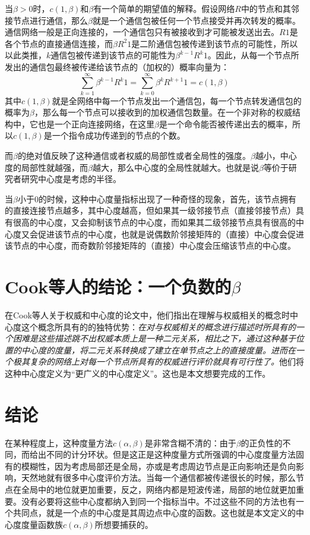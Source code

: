 \documentclass{ctexart}
\begin{document}
        当$\beta>0$时，$c(1,\beta)$和$\beta$有一个简单的期望值的解释。假设网络$R$中的节点和其邻接节点进行通信，那么$\beta$就是一个通信包被任何一个节点接受并再次转发的概率。通信网络一般是正向连接的，一个通信包只有被接收到才可能被发送出去。$R1$是各个节点的直接通信连接，而$\beta R^2 1$是二阶通信包被传递到该节点的可能性，所以以此类推，$k$通信包被传递到该节点的可能性为$\beta^{k-1}R^k1$。因此，从每一个节点所发出的通信包最终被传递给该节点的（加权的）概率向量为：
        $$
            \sum_{k=1}^{\infty} \beta^{k-1}R^k 1 = \sum_{k=0}^{\infty} \beta^k R^{k+1} 1 = c(1,\beta)
        $$
        其中$c(1,\beta)$就是全网络中每一个节点发出一个通信包，每一个节点转发通信包的概率为$\beta$，那么每一个节点可以接收到的加权通信包数量。在一个非对称的权威结构中，它也是一个正向连接网络，在这里$\beta$是一个命令能否被传递出去的概率，所以$c(1,\beta)$是一个指令成功传递到的节点的个数。
        
        而$\beta$的绝对值反映了这种通信或者权威的局部性或者全局性的强度。$\beta$越小，中心度的局部性就越强，而$\beta$越大，那么中心度的全局性就越大。也就是说$\beta$等价于研究者研究中心度是考虑的半径。
        
        当$\beta$小于0的时候，这种中心度量指标出现了一种奇怪的现象，首先，该节点拥有的直接连接节点越多，其中心度越高，但如果其一级邻接节点（直接邻接节点）具有很高的中心度，又会抑制该节点的中心度，而如果其二级邻接节点具有很高的中心度又会促进该节点的中心度，也就是说偶数阶邻接矩阵的（直接）中心度会促进该节点的中心度，而奇数阶邻接矩阵的（直接）中心度会压缩该节点的中心度。
        
    \section{Cook等人的结论：一个负数的$\beta$}
        在Cook等人关于权威和中心度的论文中，他们指出在理解与权威相关的概念时中心度这个概念所具有的的独特优势：\emph{在对与权威相关的概念进行描述时所具有的一个困难是这些描述跳不出权威本质上是一种二元关系，相比之下，通过这种基于位置的中心度的度量，将二元关系转换成了建立在单节点之上的直接度量。进而在一个极其复杂的网络上对每一个节点所具有的权威进行评价就具有可行性了。}他们将这种中心度定义为“更广义的中心度定义”。这也是本文想要完成的工作。
        
    \section{结论}
        在某种程度上，这种度量方法$c(\alpha,\beta)$是非常含糊不清的：由于$\beta$的正负性的不同，而给出不同的计分环状。但是这正是这种度量方式所强调的中心度度量方法固有的模糊性，因为考虑局部还是全局，亦或是考虑周边节点是正向影响还是负向影响，天然地就有很多中心度评价方法。当每一个通信都被传递很长的时候，那么节点在全局中的地位就更加重要，反之，网络内都是短波传递，局部的地位就更加重要。没有必要将这些中心度都纳入到同一个指标当中。不过这些不同的方法也有一个共同点，就是一个点的中心度是其周边点中心度的函数。这也就是本文定义的中心度度量函数族$c(\alpha,\beta)$所想要捕获的。
        
        
\end{document}
